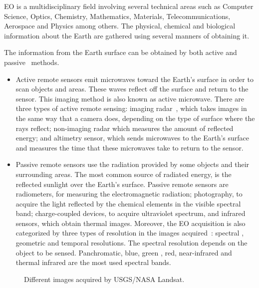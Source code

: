 \ac{EO} is a multidisciplinary field involving several technical areas such as
Computer Science, Optics,
Chemistry, Mathematics, Materials, Telecommunications, Aerospace and Physics among others. The physical, chemical and biological
information about the Earth are gathered using several manners of obtaining it.

The information from the Earth surface can be obtained by both active  and
passive~\cite{NASA} methods.
\begin{itemize}
\item Active remote sensors emit microwaves toward the Earth's
surface in order to scan objects and areas. These waves reflect off the surface and return to the sensor. This imaging
method is also known as active microwave. There are three types of active remote
sensing: imaging radar~\cite{NSIDC}, which takes images in the same way that a
camera does, depending on the type of
surface where the rays reflect; non-imaging radar which measures the amount of reflected energy; and altimetry
sensor, which sends microwaves to the Earth's surface and measures the time that these
microwaves take to return to the sensor.\\
\item Passive remote sensors use the radiation provided by some objects and
  their surrounding areas. The most common source of radiated energy, is the reflected
sunlight over the Earth's surface. Passive remote sensors are radiometers, for
measuring the electromagnetic radiation; photography, to acquire the light
reflected by the chemical elements in the visible spectral band; charge-coupled
devices, to acquire ultraviolet spectrum, and infrared sensors, which obtain thermal
images. Moreover, the \ac{EO} acquisition is also categorized by three types of
resolution in the images acquired~\cite{Sandau2009}: spectral , geometric and temporal
resolutions. The spectral resolution depends on the object to be
sensed. Panchromatic, blue, green , red, near-infrared and thermal infrared are the
most used spectral bands.
\end{itemize}
\begin{figure*}
\begin{center}
 \hspace{0.05\textwidth}
\caption{Different images acquired by \acs{USGS}/\acs{NASA} Landsat.}
\end{center}
\end{figure*}

